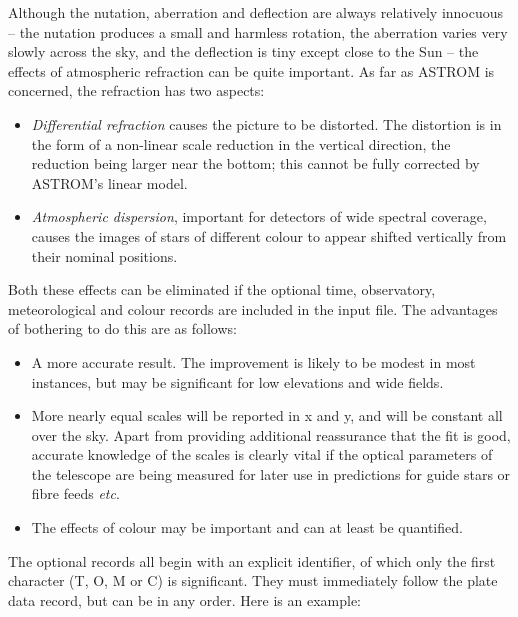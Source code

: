 \documentclass[twoside,11pt]{article}
\renewcommand{\_}{\texttt{\symbol{95}}}
\begin{document}
Although the nutation, aberration and deflection are always relatively
innocuous -- the nutation produces a small and harmless rotation, the
aberration varies very slowly across the sky, and the deflection is
tiny except close to the Sun -- the effects of atmospheric refraction
can be quite important.  As far as ASTROM is concerned, the refraction
has two aspects:

\begin{itemize}

   \item \textit{Differential refraction} causes the picture to be
      distorted.  The distortion is in the form of a non-linear scale
      reduction in the vertical direction, the reduction being larger
      near the bottom;  this cannot be fully corrected by ASTROM's
      linear model.

   \item \textit{Atmospheric dispersion}, important for detectors of wide
      spectral coverage, causes the images of stars of different colour
      to appear shifted vertically from their nominal positions.

\end{itemize}

Both these effects can be eliminated if the optional time, observatory,
meteorological and colour records are included in the input file.
The advantages of bothering to do this are as follows:

\begin{itemize}

   \item A more accurate result.  The improvement is likely to be modest
      in most instances, but may be significant for low elevations and
      wide fields.

   \item More nearly equal scales will be reported in x and y, and will be
      constant all over the sky.  Apart from providing additional
      reassurance that the fit is good, accurate knowledge of the scales
      is clearly vital if the optical parameters of the telescope are
      being measured for later use in predictions for guide stars or
      fibre feeds \textit{etc}.

   \item The effects of colour may be important and can at least be
      quantified.

\end{itemize}

The optional records all begin with an explicit identifier, of
which only the first character (T, O, M or C) is significant.
They must immediately follow the plate data record, but
can be in any order.   Here is an example:
\end{document}
